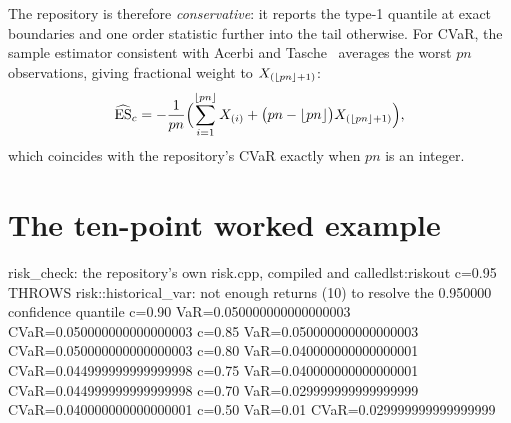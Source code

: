 The repository is therefore \emph{conservative}: it reports the type-1 quantile at exact boundaries and one order statistic
further into the tail otherwise. For CVaR, the sample estimator consistent with Acerbi and Tasche~\cite{acerbi2002coherence}
averages the worst $pn$ observations, giving fractional weight to $X_{(\lfloor pn\rfloor+1)}$:
\[ \widehat{\mathrm{ES}}_c=-\frac{1}{pn}\Bigl(\sum_{i=1}^{\lfloor pn\rfloor}X_{(i)}+\bigl(pn-\lfloor pn\rfloor\bigr)X_{(\lfloor pn\rfloor+1)}\Bigr), \]
which coincides with the repository's CVaR exactly when $pn$ is an integer.

\section{The ten-point worked example}\label{sec:tenpoint}

\begin{progout}{risk\_check: the repository's own risk.cpp, compiled and called}{lst:riskout}
c=0.95 THROWS risk::historical_var: not enough returns (10) to resolve the 0.950000 confidence quantile
c=0.90 VaR=0.050000000000000003 CVaR=0.050000000000000003
c=0.85 VaR=0.050000000000000003 CVaR=0.050000000000000003
c=0.80 VaR=0.040000000000000001 CVaR=0.044999999999999998
c=0.75 VaR=0.040000000000000001 CVaR=0.044999999999999998
c=0.70 VaR=0.029999999999999999 CVaR=0.040000000000000001
c=0.50 VaR=0.01 CVaR=0.029999999999999999
\end{progout}

